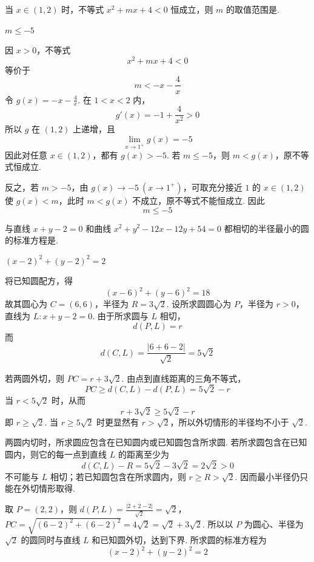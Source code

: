\begin{problem}
当 \(x \in (1,2)\) 时，不等式 \(x^2 + mx + 4 < 0\) 恒成立，则 \(m\) 的取值范围是\fillinblank{}.
\end{problem}

\begin{answer}
\(m\leqslant-5\)
\end{answer}

\begin{solution}
因 \(x>0\)，不等式
\[
x^2+mx+4<0
\]
等价于
\[
m<-x-\frac4x
\]
令 \(g(x)=-x-\frac4x\). 在 \(1<x<2\) 内，
\[
g'(x)=-1+\frac4{x^2}>0
\]
所以 \(g\) 在 \((1,2)\) 上递增，且
\[
\lim_{x\to1^+}g(x)=-5
\]
因此对任意 \(x\in(1,2)\)，都有 \(g(x)>-5\). 若 \(m\leqslant-5\)，则 \(m<g(x)\)，原不等式恒成立.

反之，若 \(m>-5\)，由 \(g(x)\to-5\ (x\to1^+)\)，可取充分接近 \(1\) 的 \(x\in(1,2)\) 使 \(g(x)<m\)，此时 \(m<g(x)\) 不成立，原不等式不能恒成立. 因此
\[
m\leqslant-5
\]
\end{solution}

\begin{problem}
与直线 \(x + y - 2 = 0\) 和曲线 \(x^{2} + y^{2} - 12x - 12y + 54 = 0\) 都相切的半径最小的圆的标准方程是\fillinblank{}.
\end{problem}

\begin{answer}
\((x-2)^2+(y-2)^2=2\)
\end{answer}

\begin{solution}
将已知圆配方，得
\[
(x-6)^2+(y-6)^2=18
\]
故其圆心为 \(C=(6,6)\)，半径为 \(R=3\sqrt2\). 设所求圆圆心为 \(P\)，半径为 \(r>0\)，直线为 \(L:x+y-2=0\). 由于所求圆与 \(L\) 相切，
\[
d(P,L)=r
\]
而
\[
d(C,L)=\frac{|6+6-2|}{\sqrt2}=5\sqrt2
\]

若两圆外切，则 \(PC=r+3\sqrt2\). 由点到直线距离的三角不等式，
\[
PC\geqslant d(C,L)-d(P,L)=5\sqrt2-r
\]
当 \(r<5\sqrt2\) 时，从而
\[
r+3\sqrt2\geqslant5\sqrt2-r
\]
即 \(r\geqslant\sqrt2\). 当 \(r\geqslant5\sqrt2\) 时更显然有 \(r>\sqrt2\)，所以外切情形的半径均不小于 \(\sqrt2\).

两圆内切时，所求圆应包含在已知圆内或已知圆包含所求圆. 若所求圆包含在已知圆内，则它的每一点到直线 \(L\) 的距离至少为
\[
d(C,L)-R=5\sqrt2-3\sqrt2=2\sqrt2>0
\]
不可能与 \(L\) 相切；若已知圆包含在所求圆内，则 \(r\geqslant R>\sqrt2\). 因而最小半径仍只能在外切情形取得.

取 \(P=(2,2)\)，则
\(d(P,L)=\frac{|2+2-2|}{\sqrt2}=\sqrt2\)，\(PC=\sqrt{(6-2)^2+(6-2)^2}=4\sqrt2 =\sqrt2+3\sqrt2\).
所以以 \(P\) 为圆心、半径为 \(\sqrt2\) 的圆同时与直线 \(L\) 和已知圆外切，达到下界. 所求圆的标准方程为
\[
\boxed{(x-2)^2+(y-2)^2=2}
\]
\end{solution}

